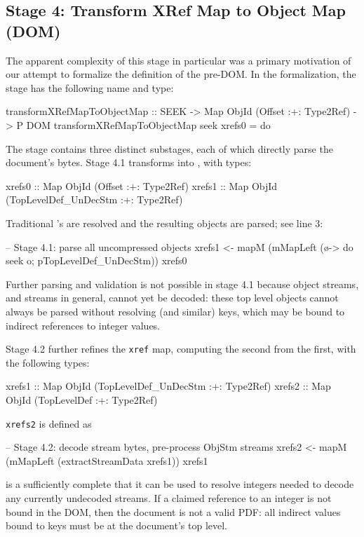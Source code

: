 \subsection{Stage 4: Transform XRef Map to Object Map (DOM)}
\label{sec:stage-4}
%
The apparent complexity of this stage in particular was a primary motivation of our attempt to formalize the definition of the pre-DOM.
%
In the formalization, the stage has the following name and type:
\begin{code}
transformXRefMapToObjectMap
  :: SEEK -> Map ObjId (Offset :+: Type2Ref) -> P DOM
transformXRefMapToObjectMap seek xrefs0 = do
\end{code}
%
The stage contains three distinct substages, each of which directly parse the document's bytes.
%
Stage 4.1 transforms  into , with types:
\begin{codeNoExecute}
  xrefs0 :: Map ObjId (Offset               :+: Type2Ref) 
  xrefs1 :: Map ObjId (TopLevelDef_UnDecStm :+: Type2Ref)
\end{codeNoExecute}
%
Traditional 's are resolved and the resulting objects are parsed; see line 3:
\begin{code}
    -- Stage 4.1: parse all uncompressed objects
    xrefs1 <- mapM
                (mMapLeft (\o-> do {seek o; pTopLevelDef_UnDecStm}))
                xrefs0
\end{code}
Further parsing and validation is not possible in stage 4.1 because object streams, and streams in general, cannot yet be decoded: these top level objects cannot always be parsed without resolving  (and similar) keys, which may be bound to indirect references to integer values.

Stage 4.2 further refines the \texttt{xref} map, computing the second from the first, with the following types:
\begin{codeNoExecute}
  xrefs1 :: Map ObjId (TopLevelDef_UnDecStm :+: Type2Ref)
  xrefs2 :: Map ObjId (TopLevelDef          :+: Type2Ref) 
\end{codeNoExecute}
\texttt{xrefs2} is defined as
\begin{code}
    -- Stage 4.2: decode stream bytes, pre-process ObjStm streams
    xrefs2 <- mapM
                (mMapLeft (extractStreamData xrefs1))
                xrefs1
\end{code}
%
 is a sufficiently complete  that it can be used to resolve integers needed to decode any currently undecoded streams.
%
If a claimed reference to an integer is not bound in the DOM, then the document is not a valid PDF: all indirect values bound to  keys must be at the document's top level.

